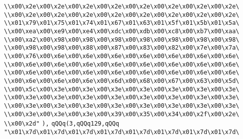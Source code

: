 \verb|\\x00\x2e\x00\x2e\x00\x2e\x00\x2e\x00\x2e\x00\x2e\x00\x2e\x00\x2e\|\newline
\verb|\\x00\x2e\x00\x2e\x00\x2e\x00\x2e\x00\x2e\x00\x2e\x00\x2e\x00\x2e\|\newline
\verb|\\x01\x79\x01\x75\x01\x74\x01\x67\x01\x63\x01\x5f\x01\x5b\x01\x5a\|\newline
\verb|\\x00\xea\x00\xe9\x00\xe4\x00\xdc\x00\xdb\x00\xc8\x00\xb7\x00\xaa\|\newline
\verb|\\x00\xa2\x00\x98\x00\x98\x00\x98\x00\x98\x00\x98\x00\x98\x00\x98\|\newline
\verb|\\x00\x98\x00\x98\x00\x88\x00\x87\x00\x83\x00\x82\x00\x7e\x00\x7a\|\newline
\verb|\\x00\x76\x00\x6e\x00\x6e\x00\x6e\x00\x6e\x00\x6e\x00\x6e\x00\x6e\|\newline
\verb|\\x00\x6e\x00\x6e\x00\x6e\x00\x6e\x00\x6e\x00\x6e\x00\x6e\x00\x6e\|\newline
\verb|\\x00\x6e\x00\x6e\x00\x6e\x00\x6e\x00\x6e\x00\x6e\x00\x6e\x00\x6e\|\newline
\verb|\\x00\x6e\x00\x6e\x00\x6e\x00\x6d\x00\x68\x00\x67\x00\x63\x00\x5d\|\newline
\verb|\\x00\x5c\x00\x3e\x00\x3e\x00\x3e\x00\x3e\x00\x3e\x00\x3e\x00\x3e\|\newline
\verb|\\x00\x3e\x00\x3e\x00\x3e\x00\x3e\x00\x3e\x00\x3e\x00\x3e\x00\x3e\|\newline
\verb|\\x00\x3e\x00\x3e\x00\x3e\x00\x3e\x00\x3e\x00\x3e\x00\x3e\x00\x3e\|\newline
\verb|\\x00\x3e\x00\x3e\x00\x3e\x00\x39\x00\x35\x00\x34\x00\x2f\x00\x2e\|\newline
\verb|\\x00\x2d"|\newline
\verb|),|\newline
\verb|qQQq(3,qQQq129,qQQq|\newline
\verb|"\x01\x7d\x01\x7d\x01\x7d\x01\x7d\x01\x7d\x01\x7d\x01\x7d\x01\x7d\|\newline
